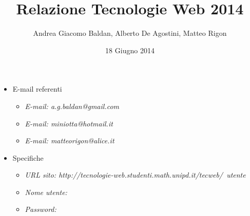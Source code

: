 \documentclass[a4paper]{article}
\title{Relazione Tecnologie Web 2014}
\author{Andrea Giacomo Baldan, Alberto De Agostini, Matteo Rigon}
\date{18 Giugno 2014}
\begin{document}
\maketitle

\begin{itemize}
\item E-mail referenti
  \begin{itemize}
  \item \emph{E-mail: a.g.baldan@gmail.com}
  \item \emph{E-mail: miniotta@hotmail.it}
  \item \emph{E-mail: matteorigon@alice.it}
  \end{itemize}
\item Specifiche
  \begin{itemize}
  \item \emph{URL sito: http://tecnologie-web.studenti.math.unipd.it/tecweb/~utente}
  \item \emph{Nome utente: }
  \item \emph{Password: }
  \end{itemize}
\end{itemize}

%
%
%

\end{document}
